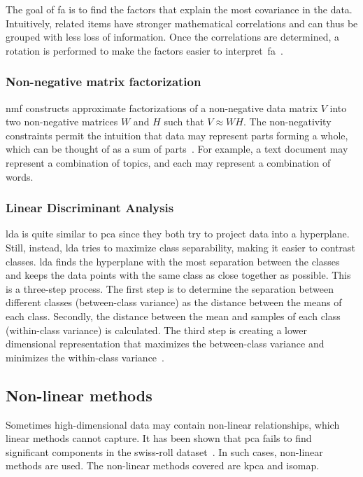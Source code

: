 The goal of \gls{fa} is to find the factors that explain the most covariance in the data. Intuitively, related items have stronger mathematical correlations and can thus be grouped with less loss of information. Once the correlations are determined, a rotation is performed to make the factors easier to interpret~\gls{fa}~\cite{decoster-1998-factor-analysis-overview}.


\subsubsection{Non-negative matrix factorization}\label{subsubsec:non-negative-matrix-factorization}
\gls{nmf} constructs approximate factorizations of a non-negative data matrix $V$ into two non-negative matrices $W$ and $H$ such that $V \approx WH$. The non-negativity constraints permit the intuition that data may represent parts forming a whole, which can be thought of as a sum of parts~\cite{lee-1999-learning-nmf}. For example, a text document may represent a combination of topics, and each may represent a combination of words.


\subsubsection{Linear Discriminant Analysis}\label{subsubsec:linear-discriminant-analysis}

\gls{lda} is quite similar to \gls{pca} since they both try to project data into a hyperplane. Still, instead, \gls{lda} tries to maximize class separability, making it easier to contrast classes. \gls{lda} finds the hyperplane with the most separation between the classes and keeps the data points with the same class as close together as possible. This is a three-step process. The first step is to determine the separation between different classes (between-class variance) as the distance between the means of each class. Secondly, the distance between the mean and samples of each class (within-class variance) is calculated. The third step is creating a lower dimensional representation that maximizes the between-class variance and minimizes the within-class variance~\cite{linear-discriminant-analysis-tutorial}.


\subsection{Non-linear methods}\label{subsec:non-linear-methods}
Sometimes high-dimensional data may contain non-linear relationships, which linear methods cannot capture. It has been shown that \gls{pca} fails to find significant components in the swiss-roll dataset~\cite{tennenbaum}. In such cases, non-linear methods are used. The non-linear methods covered are \gls{kpca} and \gls{isomap}.


